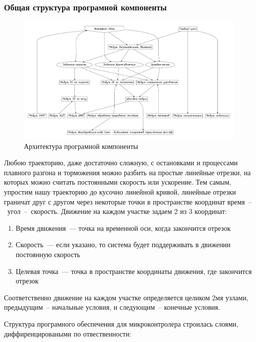 \subsubsection{Общая структура програмной компоненты}
\begin{figure}[ht!]
    \centering
    \includegraphics[width=1.3\linewidth,
                     angle=90,
                     trim=0mm 100mm 0mm 100mm]
                    {src/pictures/soft_arch.pdf}
    \caption{Архитектура програмной компоненты}
    \label{pic_soft_arch}
\end{figure}
Любою траекторию, даже достаточно сложную, с остановками и процессами плавного
разгона и торможения можно разбить на простые линейные отрезки, на которых можно
считать постоянными скорость или ускорение. Тем самым, упростим нашу траекторию
до кусочно линейной кривой, линейные отрезки граничат друг с другом через
некоторые точки в пространстве координат время~--~угол~--~скорость.
Движение на каждом участке задаем 2 из 3 координат:

\begin{enumerate}
    \item Время движения~--- точка на временной оси, когда закончится отрезок
    \item Скорость~--- если указано, то система будет поддерживать в движении
        постоянную скорость
    \item Целевая точка~--- точка в пространстве координаты движения, где
        закончится отрезок
\end{enumerate}
Соответственно движение на каждом участке определяется целиком 2мя узлами,
предыдущим~-- начальные условия, и следующим~-- конечные условия.

Структура програмного обеспечения для микроконтролера строилась слоями,
диффиренцироваными по отвественности:

